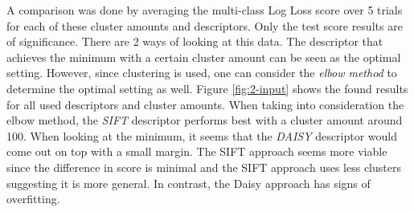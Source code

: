 A comparison was done by averaging the multi-class Log Loss score over 5 trials for each of these cluster amounts and descriptors.
Only the test score results are of significance.
There are 2 ways of looking at this data.
The descriptor that achieves the minimum with a certain cluster amount can be seen as the optimal setting.
However, since clustering is used, one can consider the \emph{elbow method} to determine the optimal setting as well.
Figure \ref{fig:2-input} shows the found results for all used descriptors and cluster amounts.
When taking into consideration the elbow method, the \emph{SIFT} descriptor performs best with a cluster amount around 100.
When looking at the minimum, it seems that the \emph{DAISY} descriptor would come out on top with a small margin.
The SIFT approach seems more viable since the difference in score is minimal and the SIFT approach uses less clusters suggesting it is more general.
In contrast, the Daisy approach has signs of overfitting.


